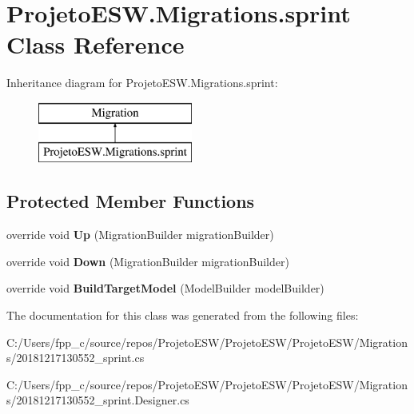 \hypertarget{class_projeto_e_s_w_1_1_migrations_1_1sprint}{}\section{Projeto\+E\+S\+W.\+Migrations.\+sprint Class Reference}
\label{class_projeto_e_s_w_1_1_migrations_1_1sprint}
Inheritance diagram for Projeto\+E\+S\+W.\+Migrations.\+sprint\+:\begin{figure}[H]
\begin{center}
\leavevmode
\includegraphics[height=2.000000cm]{class_projeto_e_s_w_1_1_migrations_1_1sprint}
\end{center}
\end{figure}
\subsection*{Protected Member Functions}
\begin{DoxyCompactItemize}
\item 
\mbox{\label{class_projeto_e_s_w_1_1_migrations_1_1sprint_ade1ca48d63da26eae8b27edadf2dd69b}} 
override void {\bfseries Up} (Migration\+Builder migration\+Builder)
\item 
\mbox{\label{class_projeto_e_s_w_1_1_migrations_1_1sprint_aa6eca0c7f972ba8522b991c1672c32e9}} 
override void {\bfseries Down} (Migration\+Builder migration\+Builder)
\item 
\mbox{\label{class_projeto_e_s_w_1_1_migrations_1_1sprint_addcf0d64769f2d174336b865440cc4b9}} 
override void {\bfseries Build\+Target\+Model} (Model\+Builder model\+Builder)
\end{DoxyCompactItemize}


The documentation for this class was generated from the following files\+:\begin{DoxyCompactItemize}
\item 
C\+:/\+Users/fpp\+\_\+c/source/repos/\+Projeto\+E\+S\+W/\+Projeto\+E\+S\+W/\+Projeto\+E\+S\+W/\+Migrations/20181217130552\+\_\+sprint.\+cs\item 
C\+:/\+Users/fpp\+\_\+c/source/repos/\+Projeto\+E\+S\+W/\+Projeto\+E\+S\+W/\+Projeto\+E\+S\+W/\+Migrations/20181217130552\+\_\+sprint.\+Designer.\+cs\end{DoxyCompactItemize}
